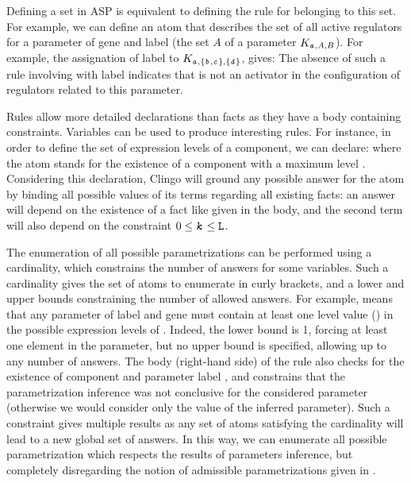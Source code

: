 Defining a set in ASP is equivalent to defining the rule for belonging to this set. For example, we can define an atom  that describes the set of all active regulators for a parameter of gene  and label  (\ie the set $A$ of a parameter $K_{\texttt{\textit{a}},A,B}$). For example, the assignation of label  to $K_{\texttt{\textit{a}},\{\texttt{\textit{b}},\texttt{\textit{c}}\},\{\texttt{\textit{d}}\}}$, gives:
The absence of such a rule involving  with label  indicates that  is not an activator in the configuration of regulators related to this parameter.

Rules allow more detailed declarations than facts as they have a body containing constraints. Variables can be used to produce interesting rules.
For instance, in order to define the set of expression levels of a component, we can declare:
where the  atom stands for the existence of a component  with a maximum level .
Considering this declaration, Clingo will ground any possible answer for the atom  by binding all possible values of its terms regarding all existing facts: an answer  will depend on the existence of a fact like given in the body, and the second term will also depend on the constraint $0 \leq \texttt{\textit{k}} \leq \texttt{L}$.

The enumeration of all possible parametrizations can be performed using a cardinality, which constrains the number of answers for some variables.
Such a cardinality gives the set of atoms to enumerate in curly brackets, and a lower and upper bounds constraining the number of allowed answers.
For example,
means that any parameter of label  and gene  must contain at least one level value () in the possible expression levels of .
Indeed, the lower bound is 1, forcing at least one element in the parameter, but no upper bound is specified, allowing up to any number of answers.
The body (right-hand side) of the rule also checks for the existence of component  and parameter label , and constrains that the parametrization inference was not conclusive for the considered parameter (otherwise we would consider only the value of the inferred parameter).
Such a constraint gives multiple results as any set of atoms satisfying the cardinality will lead to a new global set of answers.
In this way, we can enumerate all possible parametrization which respects the results of parameters
inference, but completely disregarding the notion of admissible parametrizations given in
.

